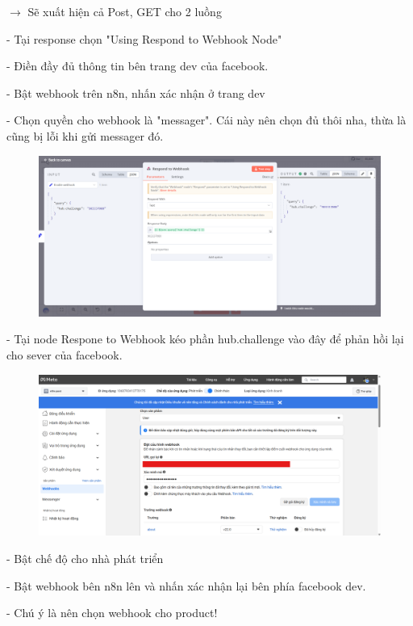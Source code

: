 $\rightarrow$ Sẽ xuất hiện cả Post, GET cho 2 luồng

- Tại response chọn "Using Respond to Webhook Node"

- Điền đầy đủ thông tin bên trang dev của facebook.

- Bật webhook trên n8n, nhấn xác nhận ở trang dev

- Chọn quyền cho webhook là "messager". Cái này nên chọn đủ thôi nha, thừa là cũng bị lỗi khi gửi messager đó.

\begin{figure}[htbp]
    \centering
    \includegraphics[width=1\linewidth]{Chap1-7/webhook2.pdf}
\end{figure}

- Tại node Respone to Webhook kéo phần hub.challenge vào đây để phản hồi lại cho sever của facebook.


\begin{figure}[htbp]
    \centering
    \includegraphics[width=1\linewidth]{Chap1-7/webhook-fb.pdf}
\end{figure}

- Bật chế độ cho nhà phát triển

- Bật webhook bên n8n lên và nhấn xác nhận lại bên phía facebook dev.

- Chú ý là nên chọn webhook cho product!
\newpage

